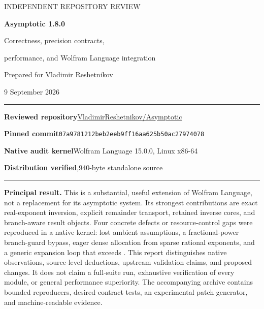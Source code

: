 \documentclass[11pt,a4paper]{article}
\newcommand{\code}[1]{\texttt{\detokenize{#1}}}
\newcommand{\commit}{\texttt{07a9781212beb2eeb9ff16aa625b50ac27974078}}
\begin{document}
\begin{titlepage}
\vspace*{12mm}
{\sffamily\color{accent}\Large INDEPENDENT REPOSITORY REVIEW\par}
\vspace{11mm}
{\sffamily\bfseries\color{ink}\fontsize{29}{34}\selectfont Asymptotic 1.8.0\par}
\vspace{5mm}
{\sffamily\fontsize{19}{25}\selectfont Correctness, precision contracts,\par performance, and Wolfram Language integration\par}
\vspace{13mm}
{\large Prepared for Vladimir Reshetnikov\par}
{\large 9 September 2026\par}
\vspace{13mm}
\hrule\vspace{4mm}
\textbf{Reviewed repository}\quad\href{https://github.com/VladimirReshetnikov/Asymptotic}{VladimirReshetnikov/Asymptotic}\par
\textbf{Pinned commit}\quad\commit\par
\textbf{Native audit kernel}\quad Wolfram Language 15.0.0, Linux x86-64\par
\textbf{Distribution verified},940-byte standalone source\par
\vspace{4mm}\hrule
\vspace{9mm}
\textbf{Principal result.} This is a substantial, useful extension of Wolfram Language, not a replacement for its asymptotic system. Its strongest contributions are exact real-exponent inversion, explicit remainder transport, retained inverse cores, and branch-aware result objects. Four concrete defects or resource-control gaps were reproduced in a native kernel: lost ambient assumptions, a fractional-power branch-guard bypass, eager dense allocation from sparse rational exponents, and a generic expansion loop that exceeds \code{MaxTerms}.
\vfill
\small This report distinguishes native observations, source-level deductions, upstream validation claims, and proposed changes. It does not claim a full-suite run, exhaustive verification of every module, or general performance superiority. The accompanying archive contains bounded reproducers, desired-contract tests, an experimental patch generator, and machine-readable evidence.
\end{titlepage}
\begingroup
\small
\setlength{\parskip}{0pt}
\tableofcontents
\endgroup
\clearpage
\end{document}
